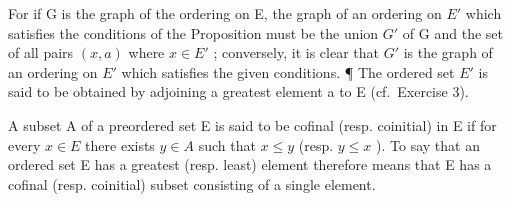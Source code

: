 For if G is the graph of the ordering on E, the graph of an ordering on \(E'\) which satisfies the conditions of the Proposition must be the union \(G'\) of G and the set of all pairs \((x, a)\) where \(x \in E'\) ; conversely, it is clear that \(G'\) is the graph of an ordering on \(E'\) which satisfies the given conditions. ¶ The ordered set \(E'\) is said to be obtained by adjoining a greatest element a to E (cf.~Exercise 3).

A subset A of a preordered set E is said to be cofinal (resp. coinitial) in E if for every \(x \in E\) there exists \(y \in A\) such that \(x \leqslant y\) (resp. \(y \leqslant x\) ). To say that an ordered set E has a greatest (resp. least) element therefore means that E has a cofinal (resp. coinitial) subset consisting of a single element.

